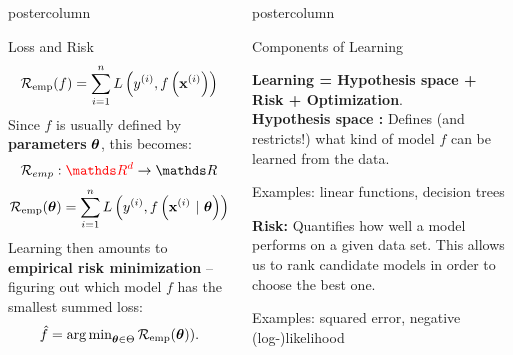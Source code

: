 \documentclass{beamer}
\newlength{\columnheight} %
\begin{document}
\begin{frame}[fragile]{}
\begin{columns}
\begin{column}{.31\textwidth}
\begin{beamercolorbox}[center]{postercolumn}
\begin{minipage}{.98\textwidth}
{\begin{myblock}{Loss and Risk}
            $$\mathcal{R}_{\text{emp}}(f) = \sum\limits_{i=1}^n L\left(y^{(i)}, f\left(\mathbf{x}^{(i)}\right)\right)$$ 
          Since $f$ is usually defined by \textbf{parameters} $\bm{\theta}$, this becomes:
            $$\risk_{emp} : \textcolor{red}{\R^d} \to \R$$
            $$\mathcal{R}_{\text{emp}}(\bm{\theta})  =  \sum\limits_{i=1}^n L\left(y^{(i)}, f\left(\mathbf{x}^{(i)} ~|~ \bm{\theta}\right)\right) $$
            \hspace*{1ex}Learning then amounts to \textbf{empirical risk minimization} -- figuring out \hspace*{1ex}which model $f$ has the smallest summed loss:$$\hat{f} = \operatorname{arg\,min}_{\bm{\theta} \in \Theta} \mathcal{R}_{\text{emp}}(\bm{\theta})).$$
				  \end{myblock}
				}
			\end{minipage}
		\end{beamercolorbox}
	\end{column}
	\begin{column}{.31\textwidth}
		\begin{beamercolorbox}[center]{postercolumn}
			\begin{minipage}{.98\textwidth}
				\parbox[t][\columnheight]{\textwidth}{
          \begin{myblock}{Components of Learning}
  
            \textbf{Learning = Hypothesis space + Risk  + Optimization}. \\
        
            \textbf{Hypothesis space : } Defines (and restricts!) what kind of model $f$
        can be learned from the data.
            
            \hspace*{1ex} Examples: linear functions, decision trees
          
          \vspace*{0.5ex}
          
          \textbf{Risk: } Quantifies how well a model performs on a given
        data set. This allows us to rank candidate models in order to choose the best one.
        
          \hspace*{1ex} Examples: squared error, negative (log-)likelihood
          
          \vspace*{0.5ex}
          

\end{myblock}}
\end{minipage}
\end{beamercolorbox}
\end{column}
\end{columns}
\end{frame}
\end{document}
